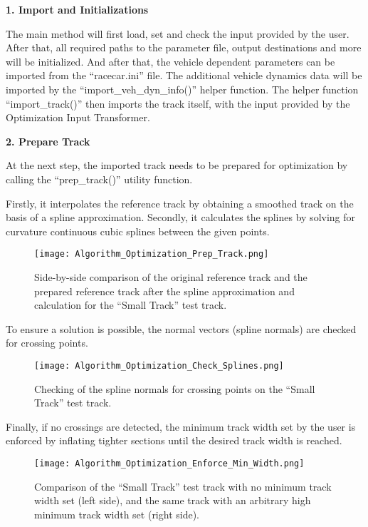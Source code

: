 \textbf{1. Import and Initializations}

The main method will first load, set and check the input provided by the user. After that, all required paths to the parameter file, output destinations and more will be initialized. And after that, the vehicle dependent parameters can be imported from the ``racecar.ini'' file. The additional vehicle dynamics data will be imported by the ``import\_veh\_dyn\_info()'' helper function. The helper function ``import\_track()'' then imports the track itself, with the input provided by the Optimization Input Transformer.

\textbf{2. Prepare Track}

At the next step, the imported track needs to be prepared for optimization by calling the ``prep\_track()'' utility function.

Firstly, it interpolates the reference track by obtaining a smoothed track on the basis of a spline approximation. Secondly, it calculates the splines by solving for curvature continuous cubic splines between the given points.
\begin{figure}[H]
    \centering
    \texttt{[image: Algorithm\_Optimization\_Prep\_Track.png]}
    \caption{Side-by-side comparison of the original reference track and the prepared reference track after the spline approximation and calculation for the ``Small Track'' test track.}
    \label{fig:Optimization Algorithm Prepare Track}
\end{figure}
To ensure a solution is possible, the normal vectors (spline normals) are checked for crossing points.
\begin{figure}[H]
    \centering
    \texttt{[image: Algorithm\_Optimization\_Check\_Splines.png]}
    \caption{Checking of the spline normals for crossing points on the ``Small Track'' test track.}
    \label{fig:Optimization Algorithm Check Spline Normals for Crossing Points}
\end{figure}
Finally, if no crossings are detected, the minimum track width set by the user is enforced by inflating tighter sections until the desired track width is reached.
\begin{figure}[H]
    \centering
    \texttt{[image: Algorithm\_Optimization\_Enforce\_Min\_Width.png]}
    \caption{Comparison of the ``Small Track'' test track with no minimum track width set (left side), and the same track with an arbitrary high minimum track width set (right side).}
    \label{fig:Optimization Algorithm Check Spline Normals for Crossing Points}
\end{figure}

